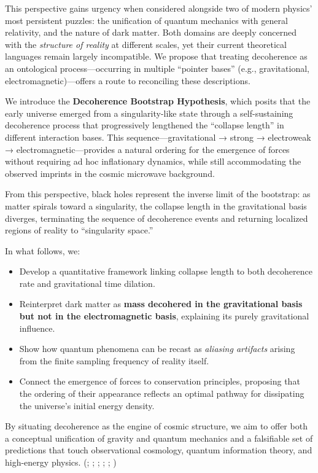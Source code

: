 \documentclass[
]{article}
\providecommand{\tightlist}{%
  \setlength{\itemsep}{0pt}\setlength{\parskip}{0pt}}
\begin{document}
This perspective gains urgency when considered alongside two of modern
physics' most persistent puzzles: the unification of quantum mechanics
with general relativity, and the nature of dark matter. Both domains are
deeply concerned with the \emph{structure of reality} at different
scales, yet their current theoretical languages remain largely
incompatible. We propose that treating decoherence as an ontological
process---occurring in multiple ``pointer bases'' (e.g., gravitational,
electromagnetic)---offers a route to reconciling these descriptions.

We introduce the \textbf{Decoherence Bootstrap Hypothesis}, which posits
that the early universe emerged from a singularity-like state through a
self-sustaining decoherence process that progressively lengthened the
``collapse length'' in different interaction bases. This
sequence---gravitational → strong → electroweak →
electromagnetic---provides a natural ordering for the emergence of
forces without requiring ad hoc inflationary dynamics, while still
accommodating the observed imprints in the cosmic microwave background.

From this perspective, black holes represent the inverse limit of the
bootstrap: as matter spirals toward a singularity, the collapse length
in the gravitational basis diverges, terminating the sequence of
decoherence events and returning localized regions of reality to
``singularity space.''

In what follows, we:

\begin{itemize}
\tightlist
\item
  Develop a quantitative framework linking collapse length to both
  decoherence rate and gravitational time dilation.
\item
  Reinterpret dark matter as \textbf{mass decohered in the gravitational
  basis but not in the electromagnetic basis}, explaining its purely
  gravitational influence.
\item
  Show how quantum phenomena can be recast as \emph{aliasing artifacts}
  arising from the finite sampling frequency of reality itself.
\item
  Connect the emergence of forces to conservation principles, proposing
  that the ordering of their appearance reflects an optimal pathway for
  dissipating the universe's initial energy density.
\end{itemize}

By situating decoherence as the engine of cosmic structure, we aim to
offer both a conceptual unification of gravity and quantum mechanics and
a falsifiable set of predictions that touch observational cosmology,
quantum information theory, and high-energy physics.
(; ; ;
;
;
)
\end{document}
